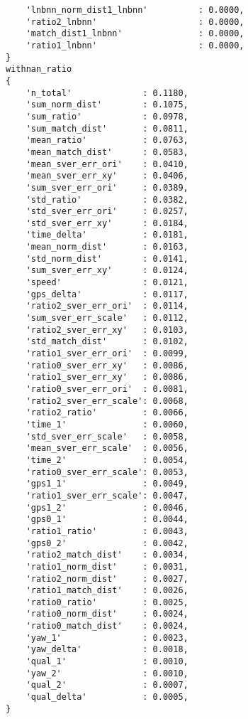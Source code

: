 \begin{verbatim}
    'lnbnn_norm_dist1_lnbnn'          : 0.0000,
    'ratio2_lnbnn'                    : 0.0000,
    'match_dist1_lnbnn'               : 0.0000,
    'ratio1_lnbnn'                    : 0.0000,
}
withnan_ratio
{
    'n_total'              : 0.1180,
    'sum_norm_dist'        : 0.1075,
    'sum_ratio'            : 0.0978,
    'sum_match_dist'       : 0.0811,
    'mean_ratio'           : 0.0763,
    'mean_match_dist'      : 0.0583,
    'mean_sver_err_ori'    : 0.0410,
    'mean_sver_err_xy'     : 0.0406,
    'sum_sver_err_ori'     : 0.0389,
    'std_ratio'            : 0.0382,
    'std_sver_err_ori'     : 0.0257,
    'std_sver_err_xy'      : 0.0184,
    'time_delta'           : 0.0181,
    'mean_norm_dist'       : 0.0163,
    'std_norm_dist'        : 0.0141,
    'sum_sver_err_xy'      : 0.0124,
    'speed'                : 0.0121,
    'gps_delta'            : 0.0117,
    'ratio2_sver_err_ori'  : 0.0114,
    'sum_sver_err_scale'   : 0.0112,
    'ratio2_sver_err_xy'   : 0.0103,
    'std_match_dist'       : 0.0102,
    'ratio1_sver_err_ori'  : 0.0099,
    'ratio0_sver_err_xy'   : 0.0086,
    'ratio1_sver_err_xy'   : 0.0086,
    'ratio0_sver_err_ori'  : 0.0081,
    'ratio2_sver_err_scale': 0.0068,
    'ratio2_ratio'         : 0.0066,
    'time_1'               : 0.0060,
    'std_sver_err_scale'   : 0.0058,
    'mean_sver_err_scale'  : 0.0056,
    'time_2'               : 0.0054,
    'ratio0_sver_err_scale': 0.0053,
    'gps1_1'               : 0.0049,
    'ratio1_sver_err_scale': 0.0047,
    'gps1_2'               : 0.0046,
    'gps0_1'               : 0.0044,
    'ratio1_ratio'         : 0.0043,
    'gps0_2'               : 0.0042,
    'ratio2_match_dist'    : 0.0034,
    'ratio1_norm_dist'     : 0.0031,
    'ratio2_norm_dist'     : 0.0027,
    'ratio1_match_dist'    : 0.0026,
    'ratio0_ratio'         : 0.0025,
    'ratio0_norm_dist'     : 0.0024,
    'ratio0_match_dist'    : 0.0024,
    'yaw_1'                : 0.0023,
    'yaw_delta'            : 0.0018,
    'qual_1'               : 0.0010,
    'yaw_2'                : 0.0010,
    'qual_2'               : 0.0007,
    'qual_delta'           : 0.0005,
}





\end{verbatim}
